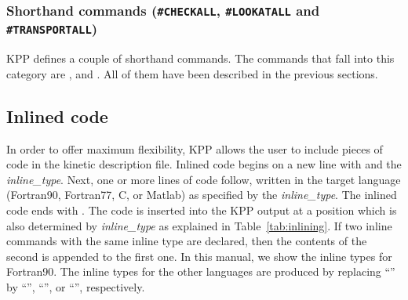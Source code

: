 \documentclass[twoside]{article}
\begin{document}
\subsubsection{Shorthand commands ({\tt\#CHECKALL}, {\tt\#LOOKATALL} and
  {\tt\#TRANSPORTALL})}
\label{sec:command-shorthand}

KPP defines a couple of shorthand commands. The commands that fall into
this category are ,  and
. All of them have been described in the previous
sections.

\subsection{Inlined code}

In order to offer maximum flexibility, KPP allows the user to include
pieces of code in the kinetic description file. Inlined code begins on a
new line with  and the {\it inline\_type}. Next, one or
more lines of code follow, written in the target language (Fortran90,
Fortran77, C, or Matlab) as specified by the {\it inline\_type}. The
inlined code ends with . The code is inserted into the
KPP output at a position which is also determined by {\it inline\_type}
as explained in Table~\ref{tab:inlining}. If two inline commands with
the same inline type are declared, then the contents of the second is
appended to the first one. In this manual, we show the inline types for
Fortran90. The inline types for the other languages are produced by
replacing ``'' by ``'', ``'', or
``'', respectively.
\end{document}
